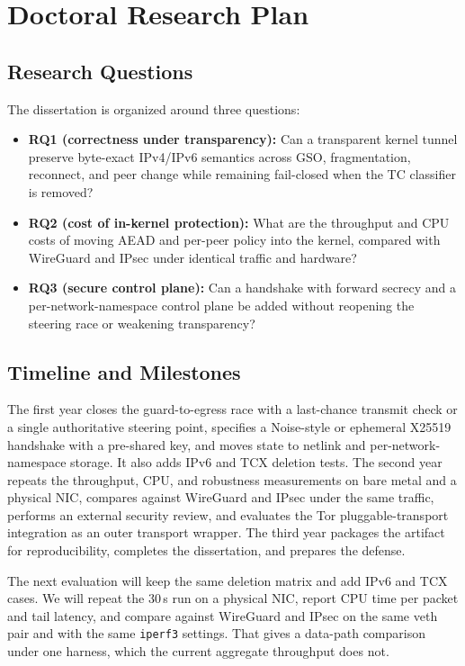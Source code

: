 \documentclass[conference]{IEEEtran}
\newcommand{\code}[1]{\texttt{#1}}
\begin{document}
\section{Doctoral Research Plan}
\subsection{Research Questions}
The dissertation is organized around three questions:
\begin{itemize}
\item \textbf{RQ1 (correctness under transparency):} Can a transparent kernel tunnel preserve byte-exact IPv4/IPv6 semantics across GSO, fragmentation, reconnect, and peer change while remaining fail-closed when the TC classifier is removed?
\item \textbf{RQ2 (cost of in-kernel protection):} What are the throughput and CPU costs of moving AEAD and per-peer policy into the kernel, compared with WireGuard and IPsec under identical traffic and hardware?
\item \textbf{RQ3 (secure control plane):} Can a handshake with forward secrecy and a per-network-namespace control plane be added without reopening the steering race or weakening transparency?
\end{itemize}

\subsection{Timeline and Milestones}
The first year closes the guard-to-egress race with a last-chance transmit check or a single authoritative steering point, specifies a Noise-style or ephemeral X25519 handshake with a pre-shared key, and moves state to netlink and per-network-namespace storage. It also adds IPv6 and TCX deletion tests. The second year repeats the throughput, CPU, and robustness measurements on bare metal and a physical NIC, compares against WireGuard and IPsec under the same traffic, performs an external security review, and evaluates the Tor pluggable-transport integration as an outer transport wrapper. The third year packages the artifact for reproducibility, completes the dissertation, and prepares the defense.

The next evaluation will keep the same deletion matrix and add IPv6 and TCX cases. We will repeat the 30\,s run on a physical NIC, report CPU time per packet and tail latency, and compare against WireGuard and IPsec on the same veth pair and with the same \code{iperf3} settings. That gives a data-path comparison under one harness, which the current aggregate throughput does not.
\end{document}

